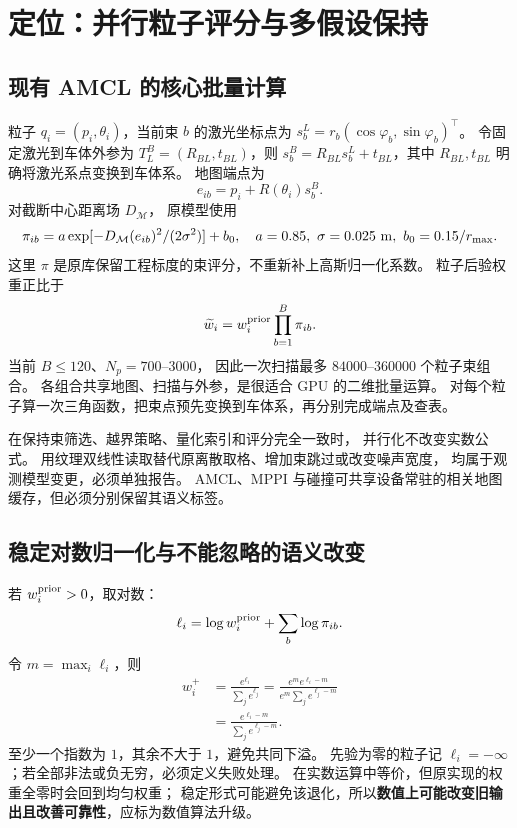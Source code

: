 \section{定位：并行粒子评分与多假设保持}
\subsection{现有 AMCL 的核心批量计算}
粒子 $q_i=(p_i,\theta_i)$，当前束 $b$ 的激光坐标点为
$s_b^L=r_b(\cos\varphi_b,\sin\varphi_b)^\top$。
令固定激光到车体外参为 $T^B_L=(R_{BL},t_{BL})$，则
$s_b^B=R_{BL}s_b^L+t_{BL}$，其中 $R_{BL},t_{BL}$ 明确将激光系点变换到车体系。
地图端点为
\[
e_{ib}=p_i+R(\theta_i)s_b^B.
\]
对截断中心距离场 $D_{\mathcal M}$，
原模型使用\cite{amclsrc}
\begin{equation}
\pi_{ib}=a\exp[-D_{\mathcal M}(e_{ib})^2/(2\sigma^2)]+b_0,
\quad a=0.85,\ \sigma=0.025\ {\rm m},\
b_0=0.15/r_{\max}.
\end{equation}
这里 $\pi$ 是原库保留工程标度的束评分，不重新补上高斯归一化系数。
粒子后验权重正比于
\begin{equation}
\widetilde w_i=w_i^{\rm prior}\prod_{b=1}^{B}\pi_{ib}.
\label{eq:amclprod}
\end{equation}
当前 $B\le120$、$N_p=700$--$3000$，
因此一次扫描最多 $84000$--$360000$ 个粒子束组合。
各组合共享地图、扫描与外参，是很适合 GPU 的二维批量运算。
对每个粒子算一次三角函数，把束点预先变换到车体系，再分别完成端点及查表。

在保持束筛选、越界策略、量化索引和评分完全一致时，
并行化不改变实数公式。
用纹理双线性读取替代原离散取格、增加束跳过或改变噪声宽度，
均属于观测模型变更，必须单独报告。
AMCL、MPPI 与碰撞可共享设备常驻的相关地图缓存，但必须分别保留其语义标签。

\subsection{稳定对数归一化与不能忽略的语义改变}
若 $w_i^{\rm prior}>0$，取对数：
\[
\ell_i=\log w_i^{\rm prior}+\sum_b\log\pi_{ib}.
\]
令 $m=\max_i\ell_i$，则
\begin{align}
w_i^+
&=\frac{e^{\ell_i}}{\sum_je^{\ell_j}}
=\frac{e^m e^{\ell_i-m}}{e^m\sum_je^{\ell_j-m}}\\
&=\frac{e^{\ell_i-m}}{\sum_je^{\ell_j-m}}.
\label{eq:logsum}
\end{align}
至少一个指数为 $1$，其余不大于 $1$，避免共同下溢。
先验为零的粒子记 $\ell_i=-\infty$；若全部非法或负无穷，必须定义失败处理。
在实数运算中等价，但原实现的权重全零时会回到均匀权重；
稳定形式可能避免该退化，所以\textbf{数值上可能改变旧输出且改善可靠性}，应标为数值算法升级。

